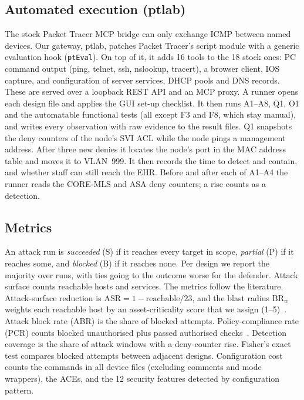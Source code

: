 \subsection{Automated execution (ptlab)}
The stock Packet Tracer MCP bridge can only exchange ICMP between named devices. Our gateway, ptlab, patches Packet Tracer's script module with a generic evaluation hook (\texttt{ptEval}). On top of it, it adds 16 tools to the 18 stock ones: PC command output (ping, telnet, ssh, nslookup, tracert), a browser client, IOS  capture, and configuration of server services, DHCP pools and DNS records. These are served over a loopback REST API and an MCP proxy. A runner opens each design file and applies the GUI set-up checklist. It then runs A1--A8, Q1, O1 and the automatable functional tests (all except F3 and F8, which stay manual), and writes every observation with raw evidence to the result files. Q1 snapshots the deny counters of the node's SVI ACL while the node pings a management address. After three new denies it locates the node's port in the MAC address table and moves it to VLAN~999. It then records the time to detect and contain, and whether staff can still reach the EHR. Before and after each of A1--A4 the runner reads the CORE-MLS and ASA deny counters; a rise counts as a detection.

\subsection{Metrics}
An attack run is \emph{succeeded} (S) if it reaches every target in scope, \emph{partial} (P) if it reaches some, and \emph{blocked} (B) if it reaches none. Per design we report the majority over runs, with ties going to the outcome worse for the defender. Attack surface counts reachable hosts and services. The metrics follow the literature. Attack-surface reduction is $\mathrm{ASR}=1-\text{reachable}/23$, and the blast radius $\mathrm{BR}_w$ weights each reachable host by an asset-criticality score that we assign (1--5)~\cite{Odule2026SimulationValidation}. Attack block rate (ABR) is the share of blocked attempts. Policy-compliance rate (PCR) counts blocked unauthorised plus passed authorised checks~\cite{Mughaid2026SecureAdaptive}. Detection coverage is the share of attack windows with a deny-counter rise. Fisher's exact test compares blocked attempts between adjacent designs. Configuration cost counts the commands in all device files (excluding comments and mode wrappers), the ACEs, and the 12 security features detected by configuration pattern.
